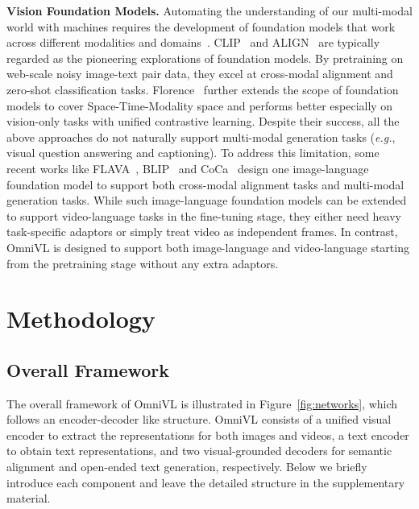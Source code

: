 \documentclass{article}
\makeatletter
\newcommand*{\system}{OmniVL\@\xspace}
\newcommand*{\eg}{\emph{e.g.}\@\xspace}
\makeatother
\begin{document}
\noindent \textbf{Vision Foundation Models.} Automating the understanding of our multi-modal world with machines requires the development of foundation models that work across different modalities and domains~\cite{bommasani2021opportunities,lu2021pretrained}. CLIP~\cite{radford2021learning} and ALIGN~\cite{jia2021scaling} are typically regarded as the pioneering explorations of foundation models. By pretraining on web-scale noisy image-text pair data, they excel at cross-modal alignment and zero-shot classification tasks. Florence~\cite{yuan2021florence} further extends the scope of foundation models to cover Space-Time-Modality space and performs better especially on vision-only tasks with unified contrastive learning. Despite their success, all the above approaches do not naturally support multi-modal generation tasks (\eg, visual question answering and captioning). To address this limitation, some recent works like FLAVA~\cite{singh2021flava}, BLIP~\cite{li2022blip} and CoCa~\cite{yu2022coca}  design one image-language foundation model to support both cross-modal alignment tasks and multi-modal generation tasks. While such image-language foundation models can be extended to support video-language tasks in the fine-tuning stage, they either need heavy task-specific adaptors or simply treat video as independent frames. In contrast, \system is designed to support both image-language and video-language starting from the pretraining stage without any extra adaptors.

\section{Methodology}


\subsection{Overall Framework}
\label{sec:arch}
The overall framework of \system is illustrated in Figure~\ref{fig:networks}, which follows an encoder-decoder like structure. \system consists of a unified visual encoder to extract the representations for both images and videos, a text encoder to obtain text representations, and two visual-grounded decoders for semantic alignment and open-ended text generation, respectively. Below we briefly introduce each component and leave the detailed structure in the supplementary material. 
\end{document}
